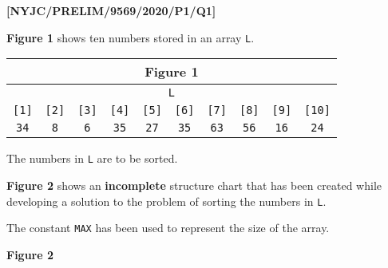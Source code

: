 \item \textbf{{[}NYJC/PRELIM/9569/2020/P1/Q1{]} }

\textbf{Figure 1} shows ten numbers stored in an array \texttt{L}.
\noindent \begin{center}
\begin{tabular}{|c|c|c|c|c|c|c|c|c|c|}
\multicolumn{10}{c}{\textbf{Figure 1}}\tabularnewline
\hline 
\multicolumn{10}{|c|}{\texttt{L}}\tabularnewline
\hline 
\texttt{{[}1{]}} & \texttt{{[}2{]}} & \texttt{{[}3{]}} & \texttt{{[}4{]}} & \texttt{{[}5{]}} & \texttt{{[}6{]}} & \texttt{{[}7{]}} & \texttt{{[}8{]}} & \texttt{{[}9{]}} & \texttt{{[}10{]}}\tabularnewline
\hline 
\texttt{34} & \texttt{8} & \texttt{6} & \texttt{35} & \texttt{27} & \texttt{35} & \texttt{63} & \texttt{56} & \texttt{16} & \texttt{24}\tabularnewline
\hline 
\end{tabular}
\par\end{center}

The numbers in \texttt{L} are to be sorted.

\textbf{Figure 2} shows an \textbf{incomplete} structure chart that
has been created while developing a solution to the problem of sorting
the numbers in \texttt{L}.

The constant \texttt{MAX} has been used to represent the size of the
array.
\noindent \begin{center}
\textbf{Figure 2} 
\par\end{center}

